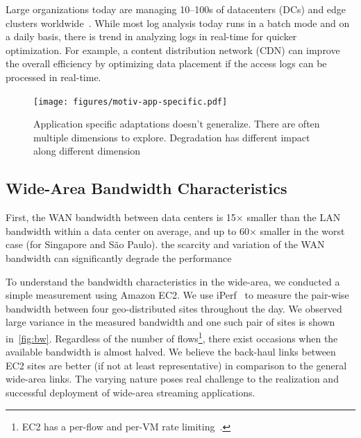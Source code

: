  Large organizations today are managing 10--100s of
datacenters (DCs) and edge clusters worldwide~\cite{calder2013mapping}. While
most log analysis today runs in a batch mode and on a daily basis, there is
trend in analyzing logs in real-time for quicker optimization. For example, a
content distribution network (CDN) can improve the overall efficiency by
optimizing data placement if the access logs can be processed in real-time.


\begin{figure}
  \centering
  \texttt{[image: figures/motiv-app-specific.pdf]}
  \caption{Application specific adaptations doesn't generalize. There are often
    multiple dimensions to explore. Degradation has different impact along
    different dimension}
  \label{fig:app-specific}
\end{figure}

\subsection{Wide-Area Bandwidth Characteristics}
\label{sec:wide-area-bandwidth}


\cite{hsieh17gaia} First, the WAN bandwidth between data centers is 15× smaller
than the LAN bandwidth within a data center on average, and up to 60× smaller in
the worst case (for Singapore and São Paulo). the scarcity and variation of the
WAN bandwidth can significantly degrade the performance


To understand the bandwidth characteristics in the wide-area, we conducted a
simple measurement using Amazon EC2. We use iPerf~\cite{iperf3} to measure the
pair-wise bandwidth between four geo-distributed sites throughout the day. We
observed large variance in the measured bandwidth and one such pair of sites is
shown in~\autoref{fig:bw}. Regardless of the number of flows\footnote{EC2 has a
  per-flow and per-VM rate limiting~\cite{zhang2016guaranteeing}.}, there exist
occasions when the available bandwidth is almost halved. We believe the
back-haul links between EC2 sites are better (if not at least representative) in
comparison to the general wide-area links. The varying nature poses real
challenge to the realization and successful deployment of wide-area streaming
applications.

